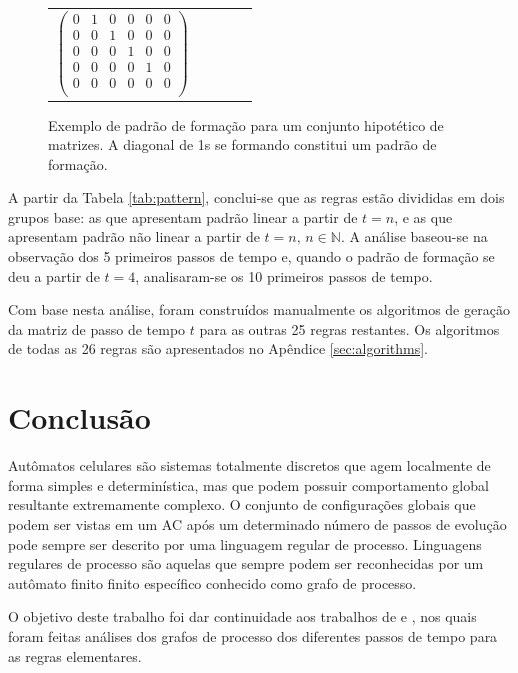 \documentclass[12pt,a4paper]{article}
\begin{document}
\begin{figure}[htp]
\begin{center}
\begin{tabular}{c c c c c}
\begin{math}
\begin{pmatrix}
0 & 1 & 0 & 0 & 0 & 0 \\
0 & 0 & 1 & 0 & 0 & 0 \\
0 & 0 & 0 & 1 & 0 & 0 \\
0 & 0 & 0 & 0 & 1 & 0 \\
0 & 0 & 0 & 0 & 0 & 0 \\
\end{pmatrix}
\end{math}
\end{tabular}
\caption[Exemplo de padrão de formação]{Exemplo de padrão de formação para um conjunto hipotético
de matrizes. A diagonal de 1s se formando constitui um padrão de formação.}
\label{fig:pattern}
\end{center}
\end{figure}

A partir da Tabela \ref{tab:pattern}, conclui-se que as regras estão divididas
em dois grupos base: as que apresentam padrão linear a partir de $t=n$, e as que
apresentam padrão não linear a partir de $t=n, \, n \in \mathbb{N}$.
A análise baseou-se na observação dos 5 primeiros passos de
tempo e, quando o padrão de formação se deu a partir de $t=4$, analisaram-se
os 10 primeiros passos de tempo.

Com base nesta análise, foram construídos manualmente os algoritmos de geração da matriz
de passo de tempo $t$ para as outras 25 regras restantes. Os algoritmos de todas as
26 regras são apresentados no Apêndice \ref{sec:algorithms}.

\newpage

\section{Conclusão}\label{sec:conclude}

Autômatos celulares são sistemas totalmente discretos que agem localmente
de forma simples e determinística, mas que podem possuir
comportamento global resultante extremamente complexo. O conjunto de
configurações globais que podem ser vistas em um AC após um determinado
número de passos de evolução pode sempre ser descrito por uma linguagem
regular de processo. Linguagens regulares de processo são aquelas que
sempre podem ser reconhecidas por um autômato finito finito específico
conhecido como grafo de processo.

O objetivo deste trabalho foi dar continuidade aos trabalhos de
 e , nos quais foram feitas
análises dos grafos de processo dos diferentes passos de tempo
para as regras elementares.
\end{document}
